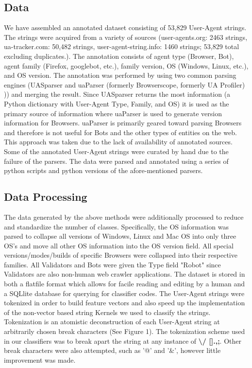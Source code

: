 \documentclass[10pt]{article}
\begin{document}
\subsection{Data}
We have assembled an annotated dataset consisting of 53,829 User-Agent strings.  The strings were acquired from a variety of sources (user-agents.org: 2463 strings, ua-tracker.com: 50,482 strings, user-agent-string.info: 1460 strings; 53,829 total excluding duplicates.).\cite{ua.org,uatracker,uas.info}  The annotation consists of agent type (Browser, Bot), agent family (Firefox, googlebot, etc.), family version, OS (Windows, Linux, etc.), and OS version.  The annotation was performed by using two common parsing engines (UASparser\cite{uas.info} and uaParser (formerly Browserscope, formerly UA Profiler)\cite{uaParser} )) and merging the result.  Since UASparser returns the most information (a Python dictionary with User-Agent Type, Family, and OS) it is used as the primary source of information where uaParser is used to generate version information for Browsers.  uaParser is primarily geared toward parsing Browsers and therefore is not useful for Bots and the other types of entities on the web.   This approach was taken due to the lack of availability of annotated sources.  Some of the annotated User-Agent strings were curated by hand due to the failure of the parsers.  The data were parsed and annotated using a series of python scripts and python versions of the afore-mentioned parsers.  
\subsection{Data Processing}
The data generated by the above methods were additionally processed to reduce and standardize the number of classes.  Specifically, the OS information was parsed to collapse all versions of Windows, Linux and Mac OS into only three OS's and move all other OS information into the OS version field.  All special versions/modes/builds of specific Browsers were collapsed into their respective families.  All Validators and Bots were given the Type field "Robot" since Validators are also non-human web crawler applications.  The dataset is stored in both a flatfile format which allows for facile reading and editing by a human and a SQLlite database for querying for classifier codes.  
The User-Agent strings were tokenized in order to build feature vectors and also speed up the implementation of the non-vector based string Kernels we used to classify the strings.  Tokenization is an atomistic deconstruction of each User-Agent string at arbitrarily chosen break characters (See Figure 1).  The tokenization scheme used in our classifiers was to break apart the string at any instance of {\bf \textbackslash / [].,;}.  Other break characters were also attempted, such as '@' and '&', however little improvement was made.  
\end{document}
